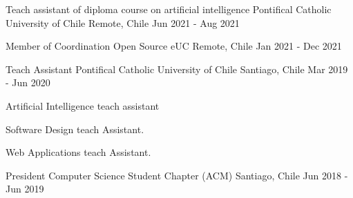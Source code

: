 

\begin{cventries}

  \cventry
  {Teach assistant of diploma course on artificial intelligence} %
  {Pontifical Catholic University of Chile} %
  {Remote, Chile} %
  {Jun 2021 - Aug 2021} %
  {}

  \cventry
  {Member of Coordination} %
  {Open Source eUC} %
  {Remote, Chile} %
  {Jan 2021 - Dec 2021} %
  {}

  \cventry
  {Teach Assistant} %
  {Pontifical Catholic University of Chile} %
  {Santiago, Chile} %
  {Mar 2019 - Jun 2020} %
  {
    \begin{cvitems} %
      \item {Artificial Intelligence teach assistant}
      \item {Software Design teach Assistant.}
      \item {Web Applications teach Assistant.}
    \end{cvitems}
  }

  \cventry
  {President} %
  {Computer Science Student Chapter (ACM)} %
  {Santiago, Chile} %
  {Jun 2018 - Jun 2019} %
  {}

\end{cventries}
